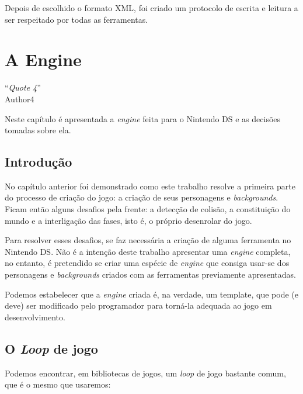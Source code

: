 \documentclass[brazil]{abnt}
\begin{document}
Depois de escolhido o formato XML, foi criado um protocolo de escrita e leitura a ser respeitado por todas as ferramentas.



\chapter{A Engine}

\vfill{}
\begin{flushright}{}``\emph{Quote 4}''\\
{\small Author4}\end{flushright}{\small \par}
\vfill{}

Neste capítulo é apresentada a \textit{engine} feita para o Nintendo DS e as decisões tomadas sobre ela.
\newpage

\section{Introdução}

No capítulo anterior foi demonstrado como este trabalho resolve a primeira parte do processo de criação do jogo: a criação de seus personagens e \textit{backgrounds}. Ficam então alguns desafios pela frente: a detecção de colisão, a constituição do mundo e a interligação das fases, isto é, o próprio desenrolar do jogo.

Para resolver esses desafios, se faz necessária a criação de alguma ferramenta no Nintendo DS. Não é a intenção deste trabalho apresentar uma \textit{engine} completa, no entanto, é pretendido se criar uma espécie de \textit{engine} que consiga usar-se dos personagens e \textit{backgrounds} criados com as ferramentas previamente apresentadas.

Podemos estabelecer que a \textit{engine} criada é, na verdade, um template, que pode (e deve) ser modificado pelo programador para torná-la adequada ao jogo em desenvolvimento.

\section{O \textit{Loop} de jogo}

Podemos encontrar, em bibliotecas de jogos, um \textit{loop} de jogo bastante comum, que é o mesmo que usaremos:


\end{document}
